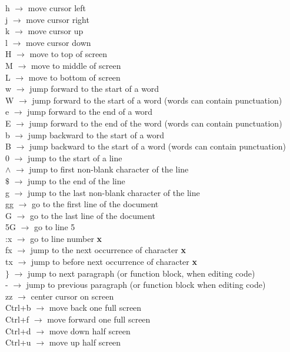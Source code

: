 \documentclass[twoside,a4paper]{article}
\newcommand{\tcr}{\color{red}}
\newcommand{\tck}{\color{black}}
\newcommand{\ra }{$\rightarrow$ }
\begin{document}
\begin{multicols}{2}
    \tcr h \tck \ra move cursor left\\
    \tcr j \tck \ra move cursor right\\
    \tcr k \tck \ra move cursor up\\
    \tcr l \tck \ra move cursor down\\
    \tcr H \tck \ra move to top of screen\\
    \tcr M \tck \ra move to middle of
    screen\\
    \tcr L \tck \ra move to bottom of
    screen\\
    \tcr w \tck \ra jump forward to the
    start of a word\\
    \tcr W \tck \ra jump forward to the
    start of a word (words can contain punctuation)\\
    \tcr e \tck \ra jump forward to the
    end of a word\\
    \tcr E \tck \ra jump forward to the end
    of the word (words can contain punctuation)\\
    \tcr b \tck \ra jump backward to the
    start of a word\\
    \tcr B \tck \ra jump backward to the
    start of a word (words can contain punctuation)\\
    \tcr 0 \tck \ra jump to the start of a
    line\\
    \tcr $\wedge$ \tck \ra jump to first
    non-blank character of the line\\
    \tcr $\$$ \tck \ra jump to the end of
    the line\\
    \tcr g \tck \ra jump to the last
    non-blank character of the line\\
    \tcr gg \tck \ra go to the first line
    of the document\\
    \tcr G \tck \ra go to the last line
    of the document\\
    \tcr 5G \tck \ra go to line 5\\
    \tcr :x \tck \ra go to line number
    \textbf{x}\\
    \tcr fx \tck \ra jump to the next
    occurrence of character \textbf{x}\\
    \tcr tx \tck \ra jump to before next
    occurrence of character \textbf{x}\\
    \tcr $\}$ \tck \ra jump to next
    paragraph (or function block, when editing code)\\
    \tcr - \tck \ra jump to previous
    paragraph (or function block when editing code)\\
    \tcr zz \tck \ra center cursor on
    screen\\
    \tcr Ctrl+b \tck \ra move back one
    full screen\\
    \tcr Ctrl+f \tck \ra move forward one
    full screen\\
    \tcr Ctrl+d \tck \ra move down half
    screen\\
    \tcr Ctrl+u \tck \ra move up half
    screen


\end{multicols}
\end{document}
